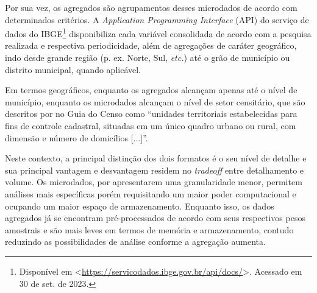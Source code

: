     Por sua vez, os agregados são agrupamentos desses microdados de acordo com determinados critérios. A \textit{Application Programming Interface} (API) do serviço de dados do IBGE\footnote{Disponível em <\url{https://servicodados.ibge.gov.br/api/docs/}>. Acessado em 30 de set. de 2023.} disponibiliza cada variável consolidada de acordo com a pesquisa realizada e respectiva periodicidade, além de agregações de caráter geográfico, indo desde grande região (p. ex. Norte, Sul, \textit{etc.}) até o grão de município ou distrito municipal, quando aplicável.

    Em termos geográficos, enquanto os agregados alcançam apenas até o nível de município, enquanto os microdados alcançam o nível de setor censitário, que são descritos por \textcite{Guia-Censo-2010} no Guia do Censo como ``unidades territoriais estabelecidas para fins de controle cadastral, situadas em um único quadro urbano ou rural, com dimensão e número de domicílios [...]''.

    Neste contexto, a principal distinção dos dois formatos é o seu nível de detalhe e sua principal vantagem e desvantagem residem no \textit{tradeoff} entre detalhamento e volume. Os microdados, por apresentarem uma granularidade menor, permitem análises mais específicas porém requisitando um maior poder computacional e ocupando um maior espaço de armazenamento. Enquanto isso, os dados agregados já se encontram pré-processados de acordo com seus respectivos pesos amostrais e são mais leves em termos de memória e armazenamento, contudo reduzindo as possibilidades de análise conforme a agregação aumenta.

    
    
